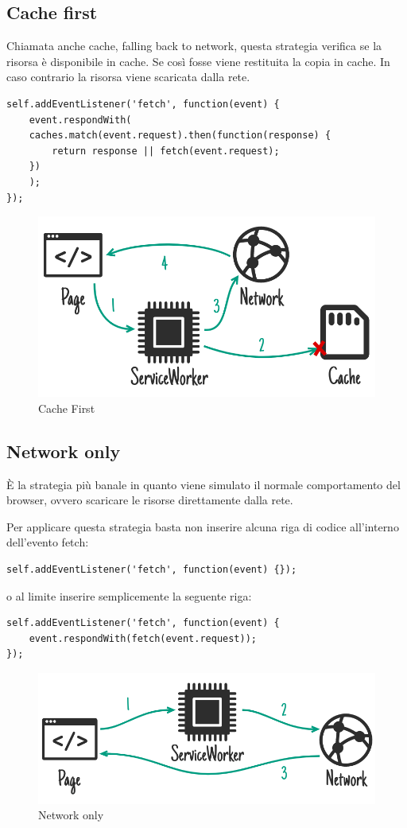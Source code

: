 \documentclass[italian]{article}
\begin{document}
\subsection{Cache first}
Chiamata anche cache, falling back to network, questa strategia verifica se la risorsa è disponibile in cache. Se così fosse viene restituita la copia in cache. In caso contrario la risorsa viene scaricata dalla rete.
\begin{lstlisting}
self.addEventListener('fetch', function(event) {
	event.respondWith(
	caches.match(event.request).then(function(response) {
		return response || fetch(event.request);
	})
	);
});
\end{lstlisting}
\begin{figure}[h]
	\centering
	\includegraphics[width=1\linewidth]{Strategia2}
	\caption{Cache First}
	\label{fig: Cache First}
\end{figure}
\pagebreak
\subsection{Network only}
È la strategia più banale in quanto viene simulato il normale comportamento del browser, ovvero scaricare le risorse direttamente dalla rete.

Per applicare  questa strategia basta non inserire alcuna riga di codice all’interno dell’evento fetch:
\begin{lstlisting}
self.addEventListener('fetch', function(event) {});
\end{lstlisting}
o al limite inserire semplicemente la seguente riga:
\begin{lstlisting}
self.addEventListener('fetch', function(event) {
	event.respondWith(fetch(event.request));
});
\end{lstlisting}
\begin{figure}[h]
	\centering
	\includegraphics[width=1\linewidth]{Strategia3}
	\caption{Network only}
	\label{fig: Network only}
\end{figure}
\pagebreak
\end{document}
